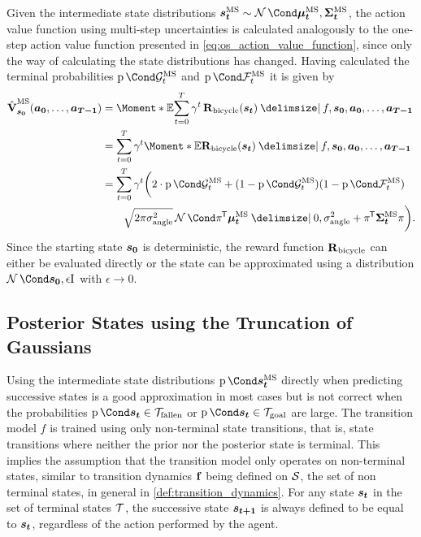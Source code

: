 Given the intermediate state distributions $\ms{\rv{s_t}} \sim \Gaussian{\ms{\mat{\mu_t}}, \ms{\mat{\Sigma_t}}}$, the action value function using multi-step uncertainties is calculated analogously to the one-step action value function presented in \cref{eq:os_action_value_function}, since only the way of calculating the state distributions has changed.
Having calculated the terminal probabilities $\Prob{\ms{\PGoal_t}}$ and $\Prob{\ms{\PFallen_t}}$ it is given by
\begin{align}
    \label{eq:ms_action_value_function}
    \begin{split}
        \ms{\AVlu}_{\mat{s_0}}(\mat{a_0}, \dots, \mat{a_{T-1}}) &= \Moment*{\E}{\sum_{t=0}^T \gamma^t \RwdBicycle(\mat{s_t}) \given f, \mat{s_0}, \mat{a_0}, \dots, \mat{a_{T-1}}} \\
        &= \sum_{t=0}^T \gamma^t \Moment*{\E}{\RwdBicycle(\mat{s_t}) \given f, \mat{s_0}, \mat{a_0}, \dots, \mat{a_{T-1}}} \\
        &= \sum_{t=0}^T \gamma^t \bigg( 2 \cdot \Prob{\ms{\PGoal}_t} + (1 - \Prob{\ms{\PGoal}_t})(1 - \Prob{\ms{\PFallen}_t}) \\
    &\qquad \sqrt{2\pi\sigma_{\text{angle}}^2} \Gaussian{\pi\tran \ms{\mat{\mu_t}} \given 0, \sigma_{\text{angle}}^2 + \pi\tran \ms{\mat{\Sigma_t}}\pi} \bigg).
    \end{split}
\end{align}
Since the starting state $\bm{s_0}$ is deterministic, the reward function $\operatorname{\operatorname{\mathbf{R}}_{\text{bicycle}}}$ can either be evaluated directly or the state can be approximated using a distribution $\Gaussian{\mat{s_0}, \epsilon\Eye}$ with $\epsilon \to 0$.

\subsection{Posterior States using the Truncation of Gaussians}
Using the intermediate state distributions $\Prob{\ms{\rv{s_t}}}$ directly when predicting successive states is a good approximation in most cases but is not correct when the probabilities $\Prob{\rv{s_t} \in \Fallen}$ or $\Prob{\rv{s_t} \in \Goal}$ are large.
The transition model $f$ is trained using only non-terminal state transitions, that is, state transitions where neither the prior nor the posterior state is terminal.
This implies the assumption that the transition model only operates on non-terminal states, similar to transition dynamics $\operatorname{\mathbf{f}}$ being defined on $\mathcal{S}$, the set of non terminal states, in general in \cref{def:transition_dynamics}.
For any state $\bm{s_t}$ in the set of terminal states $\mathcal{T}$, the successive state $\bm{s_{t+1}}$ is always defined to be equal to $\bm{s_t}$, regardless of the action performed by the agent.

